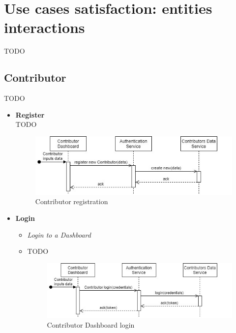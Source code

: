 \section{Use cases satisfaction: entities interactions}\label{use_cases_satisfaction}
TODO

\subsection{Contributor}
TODO

\begin{itemize}
    \item \textbf{Register}\\
    TODO
    \begin{figure}[!ht]
        \centering
        \includegraphics[scale=1.1]{document/chapters/chapter_6/images/use_cases_satisfaction_contributor_register.jpg}
        \caption{Contributor registration}
        \label{fig:use_cases_satisfaction_contributor_register}
    \end{figure}
    \item \textbf{Login}\\
    \begin{itemize}
        \item \textit{Login to a Dashboard}\\
        \item TODO
        \begin{figure}[!ht]
            \centering
            \includegraphics[scale=1.1]{document/chapters/chapter_6/images/use_cases_satisfaction_contributor_dashboard_login.jpg}
            \caption{Contributor Dashboard login}
            \label{fig:use_cases_satisfaction_contributor_dashboard_login}
        \end{figure}

\end{itemize}
\end{itemize}
